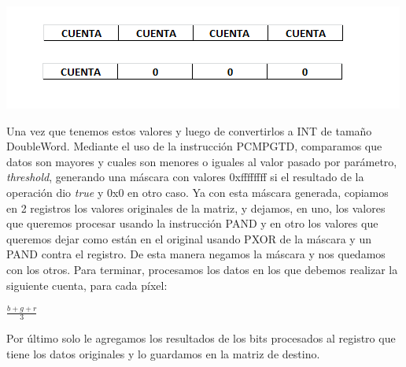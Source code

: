 \begin{center}
\includegraphics{imagenes/FinOperacion.png} 
\end{center}
 Una vez que tenemos estos valores y luego de convertirlos a INT de tamaño DoubleWord. Mediante el uso de la instrucci\'on PCMPGTD, comparamos que datos son
mayores y cuales son menores o iguales al valor pasado por par\'ametro, \emph{threshold}, generando una m\'ascara con valores 0xffffffff si el resultado de la 
operaci\'on dio \emph{true} y 0x0 en otro caso.\newline
Ya con esta m\'ascara generada, copiamos en 2 registros los valores originales de la matriz, y dejamos, en uno, los valores que queremos procesar usando la
instrucci\'on PAND y en otro los valores que queremos dejar como est\'an en el original usando PXOR de la m\'ascara y un PAND contra el registro. De esta
 manera negamos la m\'ascara y nos quedamos con los otros.\newline
Para terminar, procesamos los datos en los que debemos realizar la siguiente cuenta, para cada p\'ixel:

\begin{center}
 $\frac{b + g + r}{3}$
\end{center}

Por \'ultimo solo le agregamos los resultados de los bits procesados al registro que tiene los datos originales y lo guardamos en la matriz de destino.

